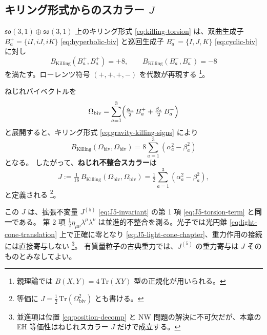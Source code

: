 \documentclass[dvipdfmx,a4paper,oneside]{jsbook}
\numberwithin{equation}{chapter}
\begin{document}
\subsection{キリング形式からのスカラー \(J\)}

\(\mathfrak{so}(3,1) \oplus \mathfrak{so}(3,1)\) 上のキリング形式 \eqref{eq:killing-torsion} は、双曲生成子 \(B_a^{+} = \{iI, iJ, iK\}\) \eqref{eq:hyperbolic-biv} と巡回生成子 \(B_a^{-} = \{I, J, K\}\) \eqref{eq:cyclic-biv} に対し
\begin{equation}
  B_{\mathrm{Killing}}(B_a^{+}, B_a^{+}) = +8,
  \qquad
  B_{\mathrm{Killing}}(B_a^{-}, B_a^{-}) = -8
  \label{eq:gravity-killing-signs}
\end{equation}
を満たす。ローレンツ符号 \((+,+,+,-)\) を代数が再現する \footnote{親理論では \(B(X,Y) = 4\,\mathrm{Tr}(XY)\) 型の正規化が用いられる。}。

ねじれバイベクトルを
\begin{equation}
  \Omega_{\mathrm{biv}}
  = \sum_{a=1}^{3} \Bigl( \tfrac{\alpha_a}{2}\, B_a^{+} + \tfrac{\beta_a}{2}\, B_a^{-} \Bigr)
  \label{eq:gravity-omega-expansion}
\end{equation}
と展開すると、キリング形式 \eqref{eq:gravity-killing-signs} により
\begin{equation}
  B_{\mathrm{Killing}}(\Omega_{\mathrm{biv}}, \Omega_{\mathrm{biv}})
  = 8 \sum_{a=1}^{3} (\alpha_a^2 - \beta_a^2)
  \label{eq:gravity-B-quadratic}
\end{equation}
となる。
したがって、\textbf{ねじれ不整合スカラー}は
\begin{equation}
  \boxed{\;
  J
  := \tfrac{1}{16}\, B_{\mathrm{Killing}}(\Omega_{\mathrm{biv}}, \Omega_{\mathrm{biv}})
  = \tfrac{1}{2} \sum_{a=1}^{3} (\alpha_a^2 - \beta_a^2),
  \;}
  \label{eq:gravity-J}
\end{equation}
と定義される \footnote{等価に \(J = \tfrac{1}{2}\,\mathrm{Tr}(\Omega_{\mathrm{biv}}^2)\) とも書ける。}。

この \(J\) は、拡張不変量 \(J^{(5)}\) \eqref{eq:J5-invariant} の第 1 項 \eqref{eq:J5-torsion-term} と\textbf{同一}である。
第 2 項 \(\tfrac{1}{2}\eta_{\mu\nu}\lambda^\mu\lambda^\nu\) は並進的不整合を測る。光子では光円錐 \eqref{eq:light-cone-translation} 上で正確に零となり \eqref{eq:J5-light-cone-chapter}、重力作用の接続には直接寄与しない \footnote{並進項は位置 \eqref{eq:position-decomp} と NW 問題の解決に不可欠だが、本章の EH 等価性はねじれスカラー \(J\) だけで成立する。}。
有質量粒子の古典重力では、\(J^{(5)}\) の重力寄与は \(J\) そのものとみなしてよい。
\end{document}
